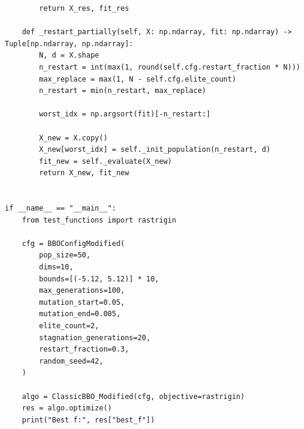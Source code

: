\begin{lstlisting}
        return X_res, fit_res

    def _restart_partially(self, X: np.ndarray, fit: np.ndarray) -> Tuple[np.ndarray, np.ndarray]:
        N, d = X.shape
        n_restart = int(max(1, round(self.cfg.restart_fraction * N)))
        max_replace = max(1, N - self.cfg.elite_count)
        n_restart = min(n_restart, max_replace)

        worst_idx = np.argsort(fit)[-n_restart:]

        X_new = X.copy()
        X_new[worst_idx] = self._init_population(n_restart, d)
        fit_new = self._evaluate(X_new)
        return X_new, fit_new


if __name__ == "__main__":
    from test_functions import rastrigin

    cfg = BBOConfigModified(
        pop_size=50,
        dims=10,
        bounds=[(-5.12, 5.12)] * 10,
        max_generations=100,
        mutation_start=0.05,
        mutation_end=0.005,
        elite_count=2,
        stagnation_generations=20,
        restart_fraction=0.3,
        random_seed=42,
    )

    algo = ClassicBBO_Modified(cfg, objective=rastrigin)
    res = algo.optimize()
    print("Best f:", res["best_f"])
\end{lstlisting}


